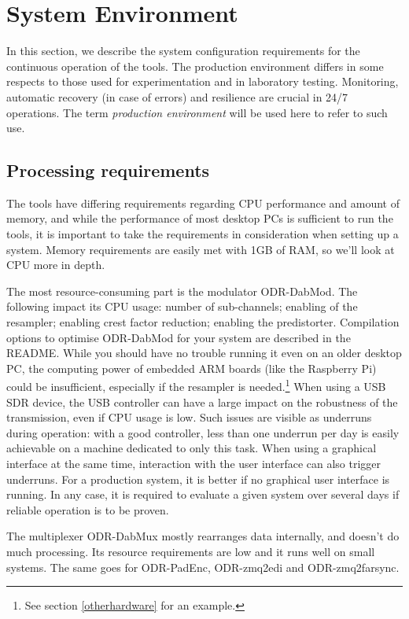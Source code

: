 \section{System Environment}
\label{systemenvironment}

In this section, we describe the system configuration requirements for the
continuous operation of the tools. The production environment differs in some
respects to those used for experimentation and in laboratory testing. Monitoring,
automatic recovery (in case of errors) and resilience are crucial in 24/7
operations. The term \emph{production environment} will be used here to refer to
such use.

\subsection{Processing requirements}

The tools have differing requirements regarding CPU performance and amount of
memory, and while the performance of most desktop PCs is sufficient to run the
tools, it is important to take the requirements in consideration when setting up
a system.
Memory requirements are easily met with 1GB of RAM, so we'll look at CPU more in
depth.

The most resource-consuming part is the modulator ODR-DabMod. The
following impact its CPU usage: number of sub-channels; enabling of the
resampler; enabling crest factor reduction; enabling the predistorter.
Compilation options to optimise ODR-DabMod for your system are described in the
README. While you should have no trouble running it even on an older desktop PC,
the computing power of embedded ARM boards (like the Raspberry Pi) could be
insufficient, especially if the resampler is needed.\footnote{See section
\ref{otherhardware} for an example.}
When using a USB SDR device, the USB controller can have a large impact on the
robustness of the transmission, even if CPU usage is low. Such issues are visible as
underruns during operation: with a good controller, less than one underrun per
day is easily achievable on a machine dedicated to only this task. When using
a graphical interface at the same time, interaction with the user interface can
also trigger underruns. For a production system, it is better if no graphical
user interface is running.
In any case, it is required to evaluate a given system over several days if
reliable operation is to be proven.

The multiplexer ODR-DabMux mostly rearranges data internally, and doesn't do
much processing. Its resource requirements are low and it runs well on small
systems. The same goes for ODR-PadEnc, ODR-zmq2edi and ODR-zmq2farsync.

